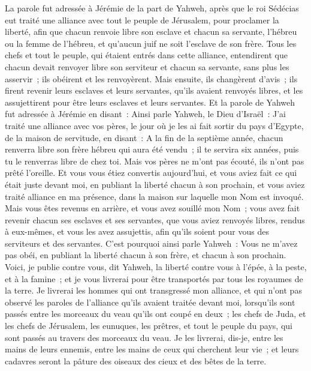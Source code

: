 \begin{multicols}{2}
La parole fut adressée à Jérémie de la part de Yahweh, après que le roi Sédécias eut traité une alliance avec tout le peuple de Jérusalem, pour proclamer la liberté,
afin que chacun renvoie libre son esclave et chacun sa servante, l'hébreu ou la femme de l'hébreu, et qu'aucun juif ne soit l'esclave de son frère.
Tous les chefs et tout le peuple, qui étaient entrés dans cette alliance, entendirent que chacun devait renvoyer libre son serviteur et chacun sa servante, sans plus les asservir~; ils obéirent et les renvoyèrent.
Mais ensuite, ils changèrent d'avis~; ils firent revenir leurs esclaves et leurs servantes, qu'ils avaient renvoyés libres, et les assujettirent pour être leurs esclaves et leurs servantes.
Et la parole de Yahweh fut adressée à Jérémie en disant~:
Ainsi parle Yahweh, le Dieu d'Israël~: J'ai traité une alliance avec vos pères, le jour où je les ai fait sortir du pays d'Egypte, de la maison de servitude, en disant~:
A la fin de la septième année, chacun renverra libre son frère hébreu qui aura été vendu~; il te servira six années, puis tu le renverras libre de chez toi. Mais vos pères ne m'ont pas écouté, ils n'ont pas prêté l'oreille.
Et vous vous étiez convertis aujourd'hui, et vous aviez fait ce qui était juste devant moi, en publiant la liberté chacun à son prochain, et vous aviez traité alliance en ma présence, dans la maison sur laquelle mon Nom est invoqué.
Mais vous êtes revenus en arrière, et vous avez souillé mon Nom~; vous avez fait revenir chacun ses esclaves et ses servantes, que vous aviez renvoyés libres, rendus à eux-mêmes, et vous les avez assujettis, afin qu'ils soient pour vous des serviteurs et des servantes.
C'est pourquoi ainsi parle Yahweh~: Vous ne m'avez pas obéi, en publiant la liberté chacun à son frère, et chacun à son prochain. Voici, je publie contre vous, dit Yahweh, la liberté contre vous à l'épée, à la peste, et à la famine~; et je vous livrerai pour être transportés par tous les royaumes de la terre.
Je livrerai les hommes qui ont transgressé mon alliance, et qui n'ont pas observé les paroles de l'alliance qu'ils avaient traitée devant moi, lorsqu'ils sont passés entre les morceaux du veau qu'ils ont coupé en deux~;
les chefs de Juda, et les chefs de Jérusalem, les eunuques, les prêtres, et tout le peuple du pays, qui sont passés au travers des morceaux du veau.
Je les livrerai, dis-je, entre les mains de leurs ennemis, entre les mains de ceux qui cherchent leur vie~; et leurs cadavres seront la pâture des oiseaux des cieux et des bêtes de la terre.

\end{multicols}
